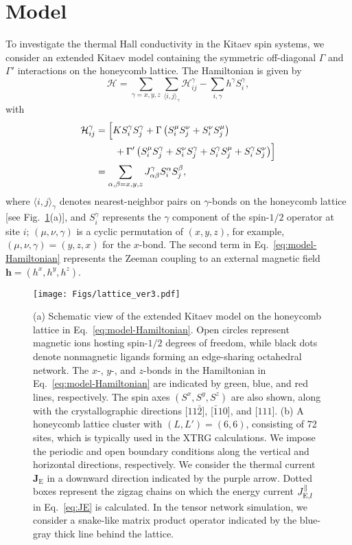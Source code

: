 \documentclass[twocolumn,superscriptaddress,showpacs, longbibliography, aps, prx]{revtex4-2}
\begin{document}
\section{Model}
\label{sec:model}
To investigate the thermal Hall conductivity in the Kitaev spin systems, we consider an extended Kitaev model containing the symmetric off-diagonal $\Gamma$ and $\Gamma'$ interactions on the honeycomb lattice. 
The Hamiltonian is given by
\begin{equation}
 \mathcal{H} = \sum_{\gamma = x,y,z} \sum_{\langle i,j \rangle_\gamma}\mathcal{H}_{ij}^\gamma -  \sum_{i,\gamma} h^\gamma S_i^\gamma,
 \label{eq:model-Hamiltonian}
\end{equation}
with
\begin{align}
 \mathcal{H}_{ij}^\gamma &= \Bigl[ K S_i^\gamma S_j^\gamma + \Gamma\left( S_i^\mu S_j^\nu + S_i^\nu S_j^\mu \right) \notag\\
&\qquad + \Gamma'\left( S_i^\mu S_j^\gamma + S_i^\nu S_j^\gamma + S_i^\gamma S_j^\mu + S_i^\gamma S_j^\nu \right) \Bigr]\\
&= \sum_{\alpha,\beta = x,y,z} J_{\alpha\beta}^\gamma S_i^\alpha S_j^\beta, 
\end{align}
where $\langle i,j\rangle_\gamma$ denotes nearest-neighbor pairs on $\gamma$-bonds on the honeycomb lattice [see Fig.~\ref{fig:lattice}(a)], and $S_i^\gamma$ represents the $\gamma$ component of the spin-$1/2$ operator at site $i$; $(\mu, \nu, \gamma)$ is a cyclic permutation of $(x,y,z)$, for example, $(\mu, \nu, \gamma)=(y,z,x)$ for the $x$-bond. 
The second term in Eq.~\eqref{eq:model-Hamiltonian} represents the Zeeman coupling to an external magnetic field $\bm{h} = (h^x, h^y, h^z)$. 

\begin{figure}
  \begin{center}
    \texttt{[image: Figs/lattice\_ver3.pdf]}    
  \end{center}
  \caption{
  (a) Schematic view of the extended Kitaev model on the honeycomb lattice in Eq.~\eqref{eq:model-Hamiltonian}. Open circles represent magnetic ions hosting spin-$1/2$ degrees of freedom, while black dots denote nonmagnetic ligands forming an edge-sharing octahedral network.
  The $x$-, $y$-, and $z$-bonds in the Hamiltonian in Eq.~\eqref{eq:model-Hamiltonian} are indicated by green, blue, and red lines, respectively. 
  The spin axes $(S^x, S^y, S^z)$ are also shown, along with the crystallographic directions [$11\bar{2}$], [$\bar{1}10$], and [$111$]. 
  (b) A honeycomb lattice cluster with  $(L, L') = (6, 6) $, consisting of 72 sites, which is typically used in the XTRG calculations. 
  We impose the periodic and open boundary conditions along the vertical and horizontal directions, respectively. 
  We consider the thermal current $\bm{J}_{\mathrm{E}}$ in a downward direction indicated by the purple arrow. 
  Dotted boxes represent the zigzag chains on which the energy current $J_{{\rm E},l}^\parallel$ in Eq.~\eqref{eq:JE} is calculated. 
  In the tensor network simulation, we consider a snake-like matrix product operator indicated by the blue-gray thick line behind the lattice.
  }
  \label{fig:lattice}
\end{figure}
\end{document}
